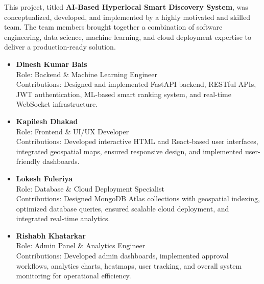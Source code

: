 \documentclass[12pt,a4paper]{report}
\begin{document}
This project, titled \textbf{AI-Based Hyperlocal Smart Discovery System}, was conceptualized, developed, and implemented by a highly motivated and skilled team. The team members brought together a combination of software engineering, data science, machine learning, and cloud deployment expertise to deliver a production-ready solution.

\begin{itemize}

    \item \textbf{Dinesh Kumar Bais} \\

    Role: Backend \& Machine Learning Engineer \\

    Contributions: Designed and implemented FastAPI backend, RESTful APIs, JWT authentication, ML-based smart ranking system, and real-time WebSocket infrastructure.

    \item \textbf{Kapilesh Dhakad} \\

    Role: Frontend \& UI/UX Developer \\

    Contributions: Developed interactive HTML and React-based user interfaces, integrated geospatial maps, ensured responsive design, and implemented user-friendly dashboards.

    \item \textbf{Lokesh Fuleriya} \\

    Role: Database \& Cloud Deployment Specialist \\

    Contributions: Designed MongoDB Atlas collections with geospatial indexing, optimized database queries, ensured scalable cloud deployment, and integrated real-time analytics.

    \item \textbf{Rishabh Khatarkar} \\

    Role: Admin Panel \& Analytics Engineer \\

    Contributions: Developed admin dashboards, implemented approval workflows, analytics charts, heatmaps, user tracking, and overall system monitoring for operational efficiency.

\end{itemize}

\vspace{0.3cm}
\end{document}
